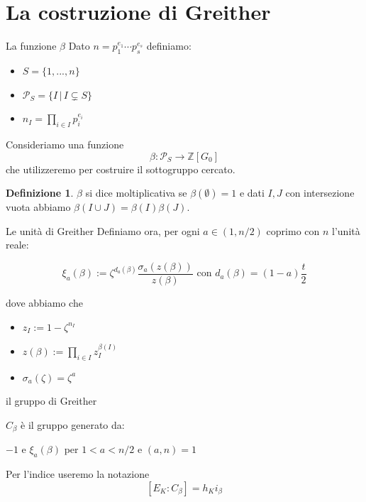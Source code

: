 \documentclass{beamer}
\theoremstyle{plain}
\theoremstyle{remark}
\theoremstyle{definition}
\newtheorem{deff}[teo]{Definizione}
\newcommand{\PS}{\mathcal{P}_S}
\newcommand{\Z}{\mathbb{Z}}
\begin{document}
	\section{La costruzione di Greither}
	
	\begin{frame}[fragile]{La funzione $\beta$}
		Dato $ n= p_1 ^{e_1} \cdots p_s ^{e_s} $ definiamo: 
		\begin{itemize}
			\item $ S = \{1, ... , n \}$
			\item $ \PS = \{ I \,|\, I \subsetneq S\}$ 
			\item $ n_I = \prod_{i \in I} p_i ^{e_i} $ 
		\end{itemize} \pause
		Consideriamo una funzione $$ \beta : \PS \to \Z[G_0] $$ che utilizzeremo per costruire il sottogruppo cercato. \pause 
		\begin{deff}
			$\beta$ si dice moltiplicativa se $ \beta (\emptyset) = 1 $ e dati $ I,J $ con intersezione vuota abbiamo $ \beta (I\cup J) = \beta(I) \beta(J)$.
		\end{deff}
	\end{frame}

	\begin{frame}{Le unità di Greither}
		Definiamo ora, per ogni $ a \in (1 , n/2)$ coprimo con $ n $ l'unità reale:
			\begin{exampleblock}{}
			\[
				\xi_a (\beta) := \zeta ^{d_a (\beta)} \frac{\sigma_a (z(\beta))}{z(\beta)} \text{ con } d_a(\beta)= (1-a)\frac{t}{2}
			\]
			\end{exampleblock}
			dove abbiamo che
			\begin{itemize}
				\item $ z_I  := 1 - \zeta ^{n_I}$
				\item $ z(\beta ):= \prod_{i\in I} z_I ^{\beta(I)} $
				\item $ \sigma_a(\zeta)= \zeta ^a $
			\end{itemize}
	\end{frame}	
	
	\begin{frame}{il gruppo di Greither}
		\begin{alertblock}{}
		 		$C_\beta $ è il gruppo generato da:
		 		\begin{center}
		 		
		 		 $ {-1} $ e $ \xi_a (\beta) $ per $ 1< a< n/2 $ e $ (a,n)=1 $
		 		\end{center}
	 	\end{alertblock}
	 	\pause
	 	Per l'indice useremo la notazione $$ [E_K : C_\beta] = h_K i_\beta $$
	\end{frame}
	
\end{document}

